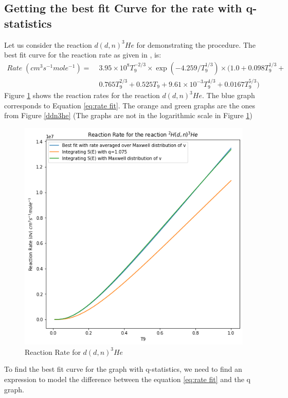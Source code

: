 \documentclass[11pt]{article}
\numberwithin{equation}{section}
\begin{document}
\subsection{Getting the best fit Curve for the rate with q-statistics}
Let us consider the reaction $d(d,n)^{3}He$ for demonstrating the procedure. The best fit curve for the reaction rate as given in \cite{smith1993experimental}, is:
\begin{align}
	Rate\;(cm^{3} s^{-1} mole^{-1}) =\; &3.95\times 10^{8} T_{9}^{-2/3}\times \exp(-4.259/T_{9}^{1/3})\times (1.0 + 0.098T_{9}^{1/3} + \nonumber \\
	&0.765T_{9}^{2/3} + 0.525T_{9}+ 9.61\times 10^{-3}T_{9}^{4/3} + 0.0167T_{9}^{5/3})\label{eq:rate fit}
\end{align}
Figure \ref{fig:reaction rate fit} shows the reaction rates for the reaction $d(d,n)^{3}He$. The blue graph corresponds to Equation \ref{eq:rate fit}. The orange and green graphs are the ones from Figure \ref{ddn3he} (The graphs are not in the logarithmic scale in Figure \ref{fig:reaction rate fit})
\begin{figure}[H]
  \centering
  \includegraphics[width=0.7\linewidth]{"./Figures/reaction rate fit.png"}
  \caption{Reaction Rate for $d(d,n)^{3}He$}
  \label{fig:reaction rate fit}
\end{figure}

To find the best fit curve for the graph with q-statistics, we need to find an expression to model the difference between the equation \ref{eq:rate fit} and the q graph. 
\end{document}
